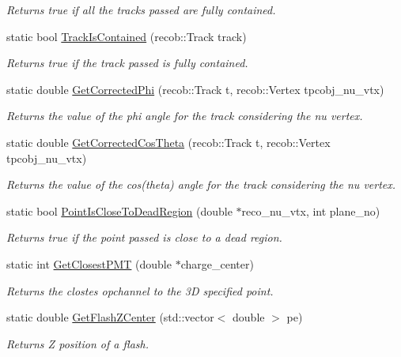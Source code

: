 \begin{DoxyCompactItemize}
\begin{DoxyCompactList}\small\item\em Returns true if all the tracks passed are fully contained. \end{DoxyCompactList}\item 
static bool \hyperlink{classUBXSecHelper_aa0349c7d405ec64cd1b0c7ed3d54a56e}{Track\-Is\-Contained} (recob\-::\-Track track)
\begin{DoxyCompactList}\small\item\em Returns true if the track passed is fully contained. \end{DoxyCompactList}\item 
static double \hyperlink{classUBXSecHelper_a79b61783bfe19d8dcd33d6aba4c3e61a}{Get\-Corrected\-Phi} (recob\-::\-Track t, recob\-::\-Vertex tpcobj\-\_\-nu\-\_\-vtx)
\begin{DoxyCompactList}\small\item\em Returns the value of the phi angle for the track considering the nu vertex. \end{DoxyCompactList}\item 
static double \hyperlink{classUBXSecHelper_aefae2cc8a7598aa54848247ad228371e}{Get\-Corrected\-Cos\-Theta} (recob\-::\-Track t, recob\-::\-Vertex tpcobj\-\_\-nu\-\_\-vtx)
\begin{DoxyCompactList}\small\item\em Returns the value of the cos(theta) angle for the track considering the nu vertex. \end{DoxyCompactList}\item 
static bool \hyperlink{classUBXSecHelper_a7df598dfbdfdb620737fd69297e67faf}{Point\-Is\-Close\-To\-Dead\-Region} (double $\ast$reco\-\_\-nu\-\_\-vtx, int plane\-\_\-no)
\begin{DoxyCompactList}\small\item\em Returns true if the point passed is close to a dead region. \end{DoxyCompactList}\item 
static int \hyperlink{classUBXSecHelper_a88533a5a59d61351437a1fe2e54aff25}{Get\-Closest\-P\-M\-T} (double $\ast$charge\-\_\-center)
\begin{DoxyCompactList}\small\item\em Returns the clostes opchannel to the 3\-D specified point. \end{DoxyCompactList}\item 
static double \hyperlink{classUBXSecHelper_a3fd25ef568b54aded55d6c1b6a8593fa}{Get\-Flash\-Z\-Center} (std\-::vector$<$ double $>$ pe)
\begin{DoxyCompactList}\small\item\em Returns Z position of a flash. \end{DoxyCompactList}\end{DoxyCompactItemize}


